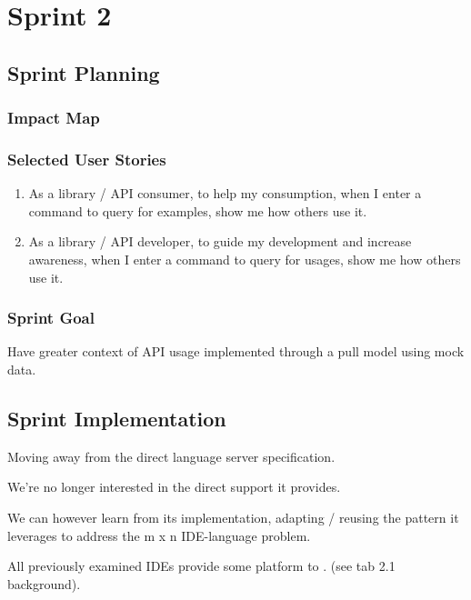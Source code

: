 \section{Sprint 2}

\subsection{Sprint Planning}

\subsubsection{Impact Map}

\subsubsection{Selected User Stories}

\begin{enumerate}
	\item As a library / API consumer, to help my consumption, when I enter a command to query for examples, show me how others use it.
	
	\item As a library / API developer, to guide my development and increase awareness, when I enter a command to query for usages, show me how others use it.
	
\end{enumerate}

\subsubsection{Sprint Goal}

Have greater context of API usage implemented through a pull model using mock data.

\subsection{Sprint Implementation}

Moving away from the direct language server specification.

We're no longer interested in the direct support it provides.

We can however learn from its implementation, adapting / reusing the pattern it leverages to address the m x n IDE-language problem.

All previously examined IDEs provide some platform to . (see tab 2.1 background).

